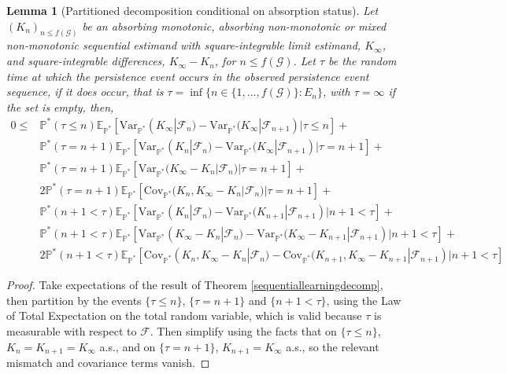 \documentclass{article}
\newcommand{\Var}{\mathrm{Var}_{\mathbb{P}^*} }
\newcommand{\Cov}{\mathrm{Cov}_{\mathbb{P}^*} }
\newtheorem{lemma}{Lemma}
\begin{document}
\begin{lemma}[Partitioned decomposition conditional on absorption status]
\label{absorptionlearning}
Let $(K_n)_{n\leq f(\mathcal{G})}$ be an absorbing monotonic, absorbing non-monotonic or mixed non-monotonic sequential estimand with square-integrable limit estimand, $K_\infty$, and square-integrable differences, $K_\infty-K_n$, for $n\leq f(\mathcal{G})$. Let $\tau$ be the random time at which the persistence event occurs in the observed persistence event sequence, if it does occur, that is $\tau=\inf\{n\in\{1,...,f(\mathcal{G})\}:E_n\}$, with $\tau=\infty$ if the set is empty, then, 
\begin{align*}
    0\leq&\mathbb{P}^*(\tau \leq n)\mathbb{E}_{\mathbb{P}^*}[\Var(K_\infty|\mathcal{F}_{n})-\Var(K_\infty|\mathcal{F}_{n+1})|\tau \leq n]+\\
    &\mathbb{P}^*(\tau=n+1)\mathbb{E}_{\mathbb{P}^*}[\Var(K_{n}|\mathcal{F}_{n})-\Var(K_\infty|\mathcal{F}_{n+1})|\tau=n+1]+\\
    &\mathbb{P}^*(\tau=n+1)\mathbb{E}_{\mathbb{P}^*}[\Var(K_\infty-K_{n}|\mathcal{F}_{n})|\tau=n+1]+\\
    &2\mathbb{P}^*(\tau=n+1)\mathbb{E}_{\mathbb{P}^*}[\Cov(K_n,K_\infty-K_n|\mathcal{F}_n)|\tau=n+1]+\\    
    &\mathbb{P}^*(n+1<\tau)\mathbb{E}_{\mathbb{P}^*}[\Var(K_{n}|\mathcal{F}_{n})-\Var(K_{n+1}|\mathcal{F}_{n+1})|n+1<\tau]+\\
    &\mathbb{P}^*(n+1<\tau)\mathbb{E}_{\mathbb{P}^*}[\Var(K_\infty-K_{n}|\mathcal{F}_{n})-\Var(K_\infty-K_{n+1}|\mathcal{F}_{n+1})|n+1<\tau]+\\
    &2\mathbb{P}^*(n+1<\tau)\mathbb{E}_{\mathbb{P}^*}[\Cov(K_n,K_\infty-K_n|\mathcal{F}_n)-\Cov(K_{n+1},K_\infty-K_{n+1}|\mathcal{F}_{n+1})|n+1<\tau]
\end{align*}
\end{lemma}
\begin{proof}
    Take expectations of the result of Theorem \ref{sequentiallearningdecomp}, then partition by the events $\{\tau \leq n\}$, $\{\tau = n+1\}$ and $\{n+1<\tau\}$, using the Law of Total Expectation on the total random variable, which is valid because $\tau$ is measurable with respect to $\mathcal{F}$. Then simplify using the facts that on $\{\tau \leq n\}$, $K_n=K_{n+1}=K_\infty$ a.s., and on $\{\tau = n+1\}$, $K_{n+1}=K_\infty$ a.s., so the relevant mismatch and covariance terms vanish.
\end{proof}
\end{document}
